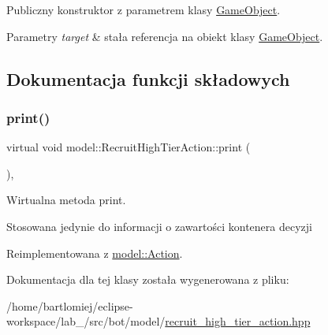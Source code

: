 Publiczny konstruktor z parametrem klasy \hyperlink{classmodel_1_1GameObject}{Game\+Object}. 


\begin{DoxyParams}{Parametry}
{\em target} & stała referencja na obiekt klasy \hyperlink{classmodel_1_1GameObject}{Game\+Object}. \\
\hline
\end{DoxyParams}


\subsection{Dokumentacja funkcji składowych}
\mbox{\label{classmodel_1_1RecruitHighTierAction_a0bedf8fdec991eff26a3eb9ffa5e552f}} 
\subsubsection{\texorpdfstring{print()}{print()}}
{\footnotesize\ttfamily virtual void model\+::\+Recruit\+High\+Tier\+Action\+::print (\begin{DoxyParamCaption}{ }\end{DoxyParamCaption})\hspace{0.3cm}{\ttfamily [inline]}, {\ttfamily [virtual]}}



Wirtualna metoda print. 

Stosowana jedynie do informacji o zawartości kontenera decyzji 

Reimplementowana z \hyperlink{classmodel_1_1Action_a2955dbb4a69e38a48aa07d730fe2d77c}{model\+::\+Action}.



Dokumentacja dla tej klasy została wygenerowana z pliku\+:\begin{DoxyCompactItemize}
\item 
/home/bartlomiej/eclipse-\/workspace/lab\+\_/src/bot/model/\hyperlink{recruit__high__tier__action_8hpp}{recruit\+\_\+high\+\_\+tier\+\_\+action.\+hpp}\end{DoxyCompactItemize}
